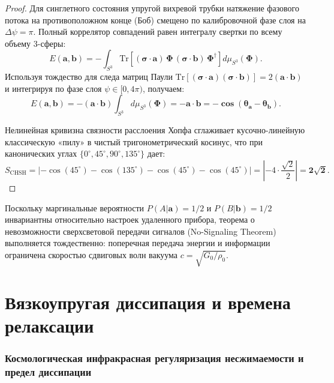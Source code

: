 \documentclass[12pt,a4paper]{article}
\begin{document}
\begin{proof}
		Для синглетного состояния упругой вихревой трубки натяжение фазового потока на противоположном конце (Боб) смещено по калибровочной фазе слоя на $\Delta \psi = \pi$. Полный коррелятор совпадений равен интегралу свертки по всему объему 3-сферы:
		\begin{equation}
			E(\mathbf{a}, \mathbf{b}) = -\int_{S^3} \mathrm{Tr}\left[ (\boldsymbol{\sigma} \cdot \mathbf{a}) \, \boldsymbol{\Phi} \, (\boldsymbol{\sigma} \cdot \mathbf{b}) \, \boldsymbol{\Phi}^\dagger \right] d\mu_{S^3}(\boldsymbol{\Phi}).
		\end{equation}
		Используя тождество для следа матриц Паули $\mathrm{Tr}[(\boldsymbol{\sigma}\cdot\mathbf{a})(\boldsymbol{\sigma}\cdot\mathbf{b})] = 2(\mathbf{a}\cdot\mathbf{b})$ и интегрируя по фазе слоя $\psi \in [0, 4\pi)$, получаем:
		\begin{equation}
			E(\mathbf{a}, \mathbf{b}) = -(\mathbf{a} \cdot \mathbf{b}) \int_{S^3} d\mu_{S^3}(\boldsymbol{\Phi}) = \mathbf{-\mathbf{a} \cdot \mathbf{b} = -\cos(\theta_a - \theta_b)}.
		\end{equation}
		
		Нелинейная кривизна связности расслоения Хопфа сглаживает кусочно-линейную классическую «пилу» в чистый тригонометрический косинус, что при канонических углах $\{0^\circ, 45^\circ, 90^\circ, 135^\circ\}$ дает:
		\begin{equation}
			S_{\mathrm{CHSH}} = \left| -\cos(45^\circ) - \cos(135^\circ) - \cos(45^\circ) - \cos(45^\circ) \right| = \left| -4 \cdot \frac{\sqrt{2}}{2} \right| = \mathbf{2\sqrt{2}}.
		\end{equation}
	\end{proof}
	
	Поскольку маргинальные вероятности $P(A|\mathbf{a}) = 1/2$ и $P(B|\mathbf{b}) = 1/2$ инвариантны относительно настроек удаленного прибора, теорема о невозможности сверхсветовой передачи сигналов (No-Signaling Theorem) выполняется тождественно: поперечная передача энергии и информации ограничена скоростью сдвиговых волн вакуума $c = \sqrt{G_0/\rho_0}$.
	
	\section{Вязкоупругая диссипация и времена релаксации}
	
	\subsubsection{Космологическая инфракрасная регуляризация несжимаемости и предел диссипации}
	
\end{document}
